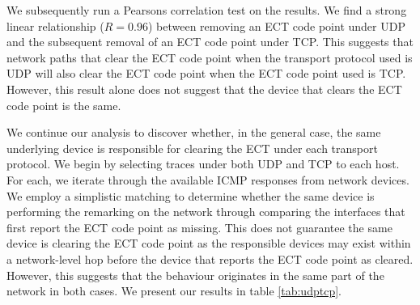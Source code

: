 \documentclass{l4proj}
\begin{document}
We subsequently run a Pearsons correlation test on the results. We find a strong linear relationship ($ R=0.96 $) between removing an ECT code point under UDP and the subsequent removal of an ECT code point under TCP. This suggests that network paths that clear the ECT code point when the transport protocol used is UDP will also clear the ECT code point when the ECT code point used is TCP. However, this result alone does not suggest that the device that clears the ECT code point is the same.

We continue our analysis to discover whether, in the general case, the same underlying device is responsible for clearing the ECT under each transport protocol. We begin by selecting traces under both UDP and TCP to each host. For each, we iterate through the available ICMP responses from network devices. We employ a simplistic matching to determine whether the same device is performing the remarking on the network through comparing the interfaces that first report the ECT code point as missing. This does not guarantee the same device is clearing the ECT code point as the responsible devices may exist within a network-level hop before the device that reports the ECT code point as cleared. However, this suggests that the behaviour originates in the same part of the network in both cases. We present our results in table \ref{tab:udptcp}.
\end{document}
